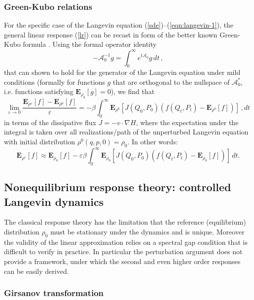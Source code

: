 \documentclass[aip,jcp,a4paper,reprint,onecolumn]{revtex4-1}
\newcommand{\eps}{\varepsilon}
\newcommand{\cA}{\mathcal A}
\newcommand{\bE}{{\mathbf E}}
\begin{document}
\subsubsection*{Green-Kubo relations} 
For the specific case of the Langevin equation (\ref{sde})--(\ref{eqn:langevin-1}), the general linear response (\ref{lr}) can be recast in form of the better known Green-Kubo formula \cite{MarconiPhysRep,Risken}. Using the formal operator identity 
\[
-\cA_{0}^{-1} g = \int_{0}^{\infty}e^{t\cA_{0}}g \,dt\,,
\]
that can shown to hold for the generator of the Langevin equation under mild conditions (formally for functions $g$ that are orthogonal to the nullspace of $\cA_{0}^{*}$, i.e. functions satisfying $\bE_{\rho_{0}}[g]=0$), we find that 
\begin{equation}\label{GreenKubo}
\lim_{\eps\to 0}\frac{\bE_{\rho^{\eps}}[f] - \bE_{\rho^{0}}[f]}{\eps} = -\beta\int_{0}^{\infty}\bE_{\rho^{0}}[J(Q_{0},P_{0}) (f(Q_{t},P_{t})-\bE_{\rho^{0}}[f])]\,,dt
\end{equation}
in terms of the dissipative flux $J=-v\cdot\nabla H$, where the expectation under the integral is taken over all realizations/path of the unperturbed Langevin equation with initial distribution $\rho^{0}(q,p,0)=\rho_{0}$. In other words: 
\[
\bE_{\rho^{\eps}}[f] \approx \bE_{\rho_{0}}[f] - \eps\beta\int_{0}^{\infty}\bE_{\rho_{0}}[J(Q_{0},P_{0}) (f(Q_{t},P_{t})-\bE_{\rho_{0}}[f])]\,dt.
\]





\subsection{Nonequilibrium response theory: controlled Langevin dynamics}

The classical response theory has the limitation that the reference (equilibrium) distribution $\rho_{0}$ must be stationary under the dynamics and is unique. Moreover the validity of the linear approximation relies on a spectral gap condition that is difficult to verify in practice. In particular the perturbation argument does not provide a framework, under which the second and even higher order responses can be easily derived. 

\subsubsection*{Girsanov transformation}
\end{document}
